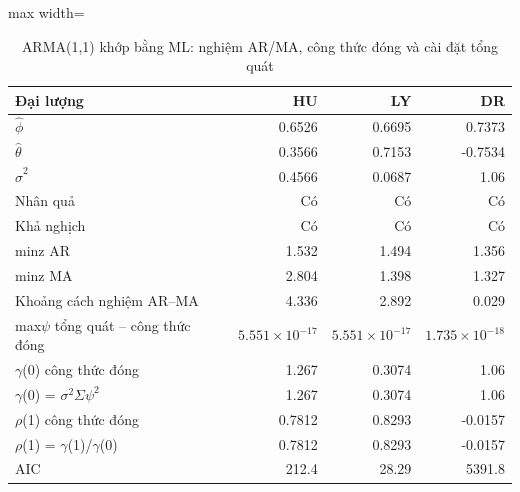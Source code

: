 \begin{table}[H]
\centering\footnotesize
\caption{ARMA(1,1) khớp bằng ML: nghiệm AR/MA, công thức đóng và cài đặt tổng quát}\label{tab:tab_b11_10_arma11}
\begin{adjustbox}{max width=\linewidth}
\begin{tabular}{|l|r|r|r|}
\toprule
Đại lượng & HU & LY & DR \\
\midrule
$\hat{\phi}$ & 0.6526 & 0.6695 & 0.7373 \\
$\hat{\theta}$ & 0.3566 & 0.7153 & -0.7534 \\
$\hat{\sigma}^{2}$ & 0.4566 & 0.0687 & 1.06 \\
Nhân quả & Có & Có & Có \\
Khả nghịch & Có & Có & Có \\
min\textbar{}z\textbar{} AR & 1.532 & 1.494 & 1.356 \\
min\textbar{}z\textbar{} MA & 2.804 & 1.398 & 1.327 \\
Khoảng cách nghiệm AR–MA & 4.336 & 2.892 & 0.029 \\
max\textbar{}$\psi$ tổng quát – công thức đóng\textbar{} & $5.551\times10^{-17}$ & $5.551\times10^{-17}$ & $1.735\times10^{-18}$ \\
$\gamma$(0) công thức đóng & 1.267 & 0.3074 & 1.06 \\
$\gamma$(0) = $\sigma^{2}\Sigma\psi^{2}$ & 1.267 & 0.3074 & 1.06 \\
$\rho$(1) công thức đóng & 0.7812 & 0.8293 & -0.0157 \\
$\rho$(1) = $\gamma$(1)/$\gamma$(0) & 0.7812 & 0.8293 & -0.0157 \\
AIC & 212.4 & 28.29 & 5391.8 \\
\bottomrule
\end{tabular}
\end{adjustbox}
\end{table}

